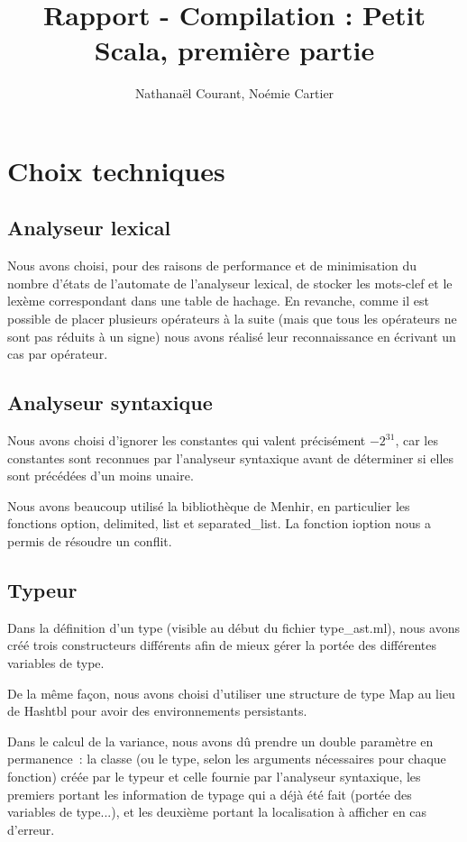 \documentclass[a4paper,10pt]{article}
\title{Rapport - Compilation : Petit Scala, première partie}
\author{Nathanaël Courant, Noémie Cartier}
\newcommand{\code}[1]{#1} %
\begin{document}
\maketitle

\section{Choix techniques}

\subsection{Analyseur lexical}

Nous avons choisi, pour des raisons de performance et de minimisation du nombre 
d'états de l'automate de l'analyseur lexical, de stocker les mots-clef et le lexème 
correspondant dans une table de hachage. En revanche, comme il est possible de 
placer plusieurs opérateurs à la suite (mais que tous les opérateurs ne sont pas 
réduits à un signe) nous avons réalisé leur reconnaissance en écrivant un cas par 
opérateur.

\subsection{Analyseur syntaxique}

Nous avons choisi d'ignorer les constantes qui valent précisément $-2^{31}$, car 
les constantes sont reconnues par l'analyseur syntaxique avant de déterminer si 
elles sont précédées d'un moins unaire.

Nous avons beaucoup utilisé la bibliothèque de Menhir, 
en particulier les fonctions 
\code{option}, \code{delimited}, \code{list} et \code{separated\_{}list}. 
La fonction \code{ioption} nous a permis de résoudre un conflit.

\subsection{Typeur}

Dans la définition d'un type (visible au début du fichier \code{type\_{}ast.ml}), nous 
avons créé trois constructeurs différents afin de mieux gérer la portée des 
différentes variables de type.

De la même façon, nous avons choisi d'utiliser une structure de type \code{Map} au lieu de \code{Hashtbl} pour avoir des environnements persistants.

Dans le calcul de la variance, nous avons dû prendre un double paramètre en 
permanence~: la classe (ou le type, selon les arguments nécessaires pour chaque 
fonction) créée par le typeur et celle fournie par l'analyseur syntaxique, les 
premiers portant les information de typage qui a déjà été fait (portée des 
variables de type...), et les deuxième portant la localisation à afficher en cas 
d'erreur.
\end{document}
